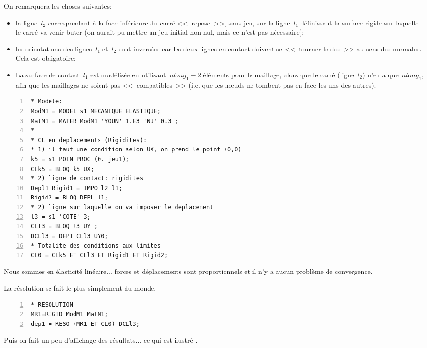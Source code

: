 \medskip
On remarquera les choses suivantes:
\begin{itemize}
  \item la ligne~$l_2$ correspondant à la face inférieure du carré <<~repose~>>, sans jeu, sur la
	ligne~$l_1$ définissant la surface rigide sur laquelle le carré va venir buter (on aurait pu mettre
	un jeu initial non nul, mais ce n'est pas nécessaire);
  \item les orientations des lignes~$l_1$ et~$l_2$ sont inversées car les deux lignes en contact doivent se 
	<<~tourner le dos~>> au sens des normales. Cela est obligatoire;
  \item La surface de contact~$l_1$ est modélisée en utilisant~$nlong_1-2$ éléments pour le maillage, 
	alors que le carré (ligne~$l_2$) n'en a que~$nlong_1$, afin que les maillages ne soient pas <<~compatibles~>> 
	(i.e. que les nœuds ne tombent pas en face les uns des autres).
\end{itemize}

\color{gris}\scriptsize
\begin{multicols}{2}
\begin{Verbatim}[numbers=left,numbersep=3pt,firstnumber=last]
* Modele:
ModM1 = MODEL s1 MECANIQUE ELASTIQUE;
MatM1 = MATER ModM1 'YOUN' 1.E3 'NU' 0.3 ;
*
* CL en deplacements (Rigidites):
* 1) il faut une condition selon UX, on prend le point (0,0)
k5 = s1 POIN PROC (0. jeu1);
CLk5 = BLOQ k5 UX;
* 2) ligne de contact: rigidites
Depl1 Rigid1 = IMPO l2 l1;
Rigid2 = BLOQ DEPL l1;
* 2) ligne sur laquelle on va imposer le deplacement
l3 = s1 'COTE' 3;
CLl3 = BLOQ l3 UY ;
DCLl3 = DEPI CLl3 UY0;
* Totalite des conditions aux limites
CL0 = CLk5 ET CLl3 ET Rigid1 ET Rigid2;
\end{Verbatim}
\end{multicols}
\color{black}\normalsize

\medskip
Nous sommes en élasticité linéaire... forces et déplacements sont proportionnels et il n'y a aucun problème 
de convergence.

La résolution se fait le plus simplement du monde.

\color{gris}\scriptsize
\begin{Verbatim}[numbers=left,numbersep=3pt,firstnumber=last]
* RESOLUTION
MR1=RIGID ModM1 MatM1;
dep1 = RESO (MR1 ET CL0) DCLl3;
\end{Verbatim}
\color{black}\normalsize

\medskip
Puis on fait un peu d'affichage des résultats... ce qui est ilustré .

